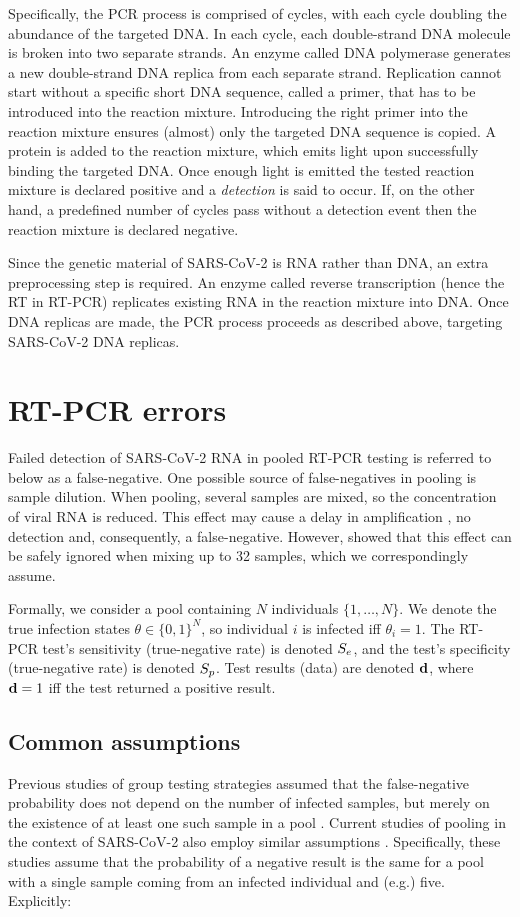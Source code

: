 \documentclass{article}
\begin{document}
Specifically, the PCR process is comprised of cycles, with each cycle
doubling the abundance of the targeted DNA. In each cycle, each
double-strand DNA molecule is broken into two separate strands. An
enzyme called DNA polymerase generates a new double-strand DNA replica
from each separate strand. Replication cannot start without a specific
short DNA sequence, called a primer, that has to be introduced into
the reaction mixture. Introducing the right primer into the reaction
mixture ensures (almost) only the targeted DNA sequence is copied. A
protein is added to the reaction mixture, which emits light upon
successfully binding the targeted DNA. Once enough light is emitted
the tested reaction mixture is declared positive and a
\emph{detection} is said to occur. If, on the other hand, a predefined
number of cycles pass without a detection event then the reaction
mixture is declared negative.

Since the genetic material of SARS-CoV-2 is RNA rather than DNA, an
extra preprocessing step is required. An enzyme called
reverse transcription (hence the RT in RT-PCR) replicates existing RNA
in the reaction mixture into DNA. Once DNA replicas are made, the PCR
process proceeds as described above, targeting SARS-CoV-2 DNA
replicas.

\section{RT-PCR errors}
Failed detection of SARS-CoV-2 RNA in pooled RT-PCR testing is
referred to below as a false-negative. One possible source of
false-negatives in pooling is sample dilution. When pooling, several
samples are mixed, so the concentration of viral RNA is reduced. This
effect may cause a delay in amplification \cite{DorfmanYuvalDor}, no
detection and, consequently, a false-negative. However, \cite{Lion}
showed that this effect can be safely ignored when mixing up to 32
samples, which we correspondingly assume.

Formally, we consider a pool containing $N$ individuals
$\{1,\dots,N\}$. We denote the true infection states $\theta \in
\{0,1\}^N$, so individual $i$ is infected iff $\theta_i=1$. The RT-PCR
test's sensitivity (true-negative rate) is denoted $S_e$, and the
test's specificity (true-negative rate) is denoted $S_p$. Test results
(data) are denoted $\mathbf{d}$, where $\mathbf{d}=1$ iff the test returned a
positive result.

\subsection{Common assumptions}
Previous studies of group testing strategies assumed that the
false-negative probability does not depend on the number of infected
samples, but merely on the existence of at least one such sample in a
pool \cite{Kim, OptimalDorfmanPool}. Current studies of pooling in the
context of SARS-CoV-2 also employ similar assumptions
\cite{Simplistic1, Simplistic2}. Specifically, these studies assume
that the probability of a negative result is the same for a pool with
a single sample coming from an infected individual and (e.g.)
five. Explicitly:
\end{document}
